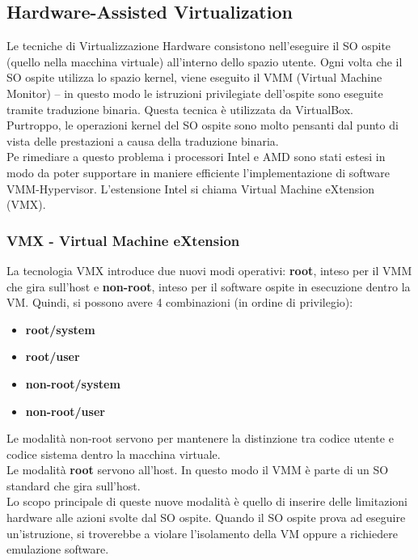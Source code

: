 \documentclass{article}
\begin{document}
\subsection{Hardware-Assisted Virtualization}
Le tecniche di Virtualizzazione Hardware consistono nell’eseguire il SO ospite (quello nella macchina virtuale) all’interno dello spazio utente. Ogni volta che il SO ospite utilizza lo spazio kernel, viene eseguito il VMM (Virtual Machine Monitor) – in questo modo le istruzioni privilegiate dell’ospite sono eseguite tramite traduzione binaria. Questa tecnica è utilizzata da VirtualBox.\\
Purtroppo, le operazioni kernel del SO ospite sono molto pensanti dal punto di vista delle prestazioni a causa della traduzione binaria.\\
Pe rimediare a questo problema i processori Intel e AMD sono stati estesi in modo da poter supportare in maniere efficiente l’implementazione di software VMM-Hypervisor. L’estensione Intel si chiama Virtual Machine eXtension (VMX).

\subsubsection{VMX - Virtual Machine eXtension}
La tecnologia VMX introduce due nuovi modi operativi: \textbf{root}, inteso per il VMM che gira sull’host e \textbf{non-root}, inteso per il software ospite in esecuzione dentro la VM. Quindi, si possono avere 4 combinazioni (in ordine di privilegio):
\begin{itemize}
    \item \textbf{root/system}
    \item \textbf{root/user}
    \item \textbf{non-root/system}
    \item \textbf{non-root/user}
\end{itemize}
Le modalità non-root servono per mantenere la distinzione tra codice utente e codice sistema dentro la macchina virtuale.\\
Le modalità \textbf{root} servono all’host. In questo modo il VMM è parte di un SO standard che gira sull’host.\\
Lo scopo principale di queste nuove modalità è quello di inserire delle limitazioni hardware alle azioni svolte dal SO ospite. Quando il SO ospite prova ad eseguire un’istruzione, si troverebbe a violare l’isolamento della VM oppure a richiedere emulazione software.
\end{document}

